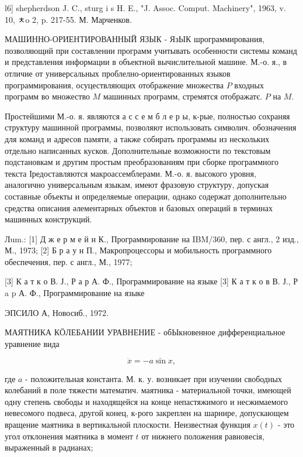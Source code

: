 \documentclass[10pt]{article}
\begin{document}
l6] shepherdson J. C., sturg i s H. E., "J. Assoc. Comput. Machinery", 1963, v. 10, ㅊo 2, p. 217-55. М. Марченков.



МАШИННО-ОРИЕНТИРОВАННЫЙ ЯЗЫК - ЯзЫК шрограммирования, позволяющий при составлении программ учитывать особенности системы команд и представления информации в объектной вычислительной машине. М.-о. я., в отличие от универсальных проблелно-ориентированных языков программирования, осуцествляющих отображение множества $P$ входных программ во множество $M$ машинных программ, стремятся отображатє. $P$ на $M$.



Простейшими М.-о. я. являются а с с е м б л е р ы, к-рые, полностью сохраняя структуру машинной программы, позволяют использовать символич. обозначения для команд и адресов памяти, а также собирать программы из нескольких отдельно написанных кусков. Дополнительные возможности по текстовым подстановкам и другим простым преобразованиям при сборке программного текста Іредоставляются макроассемблерами. М.-о. я. высокого уровня, аналогично универсальным языкам, имеют фразовую структуру, допуская составные объекты и определяемые операции, однако содержат дополнительно средства описания әлементарных объектов и базовых операций в терминах машинных конструкций.



Лum.: [1] Д ж е р м е й н К., Программирование на IBM/360, пер. с англ., 2 изд., М., 1973; [2] Б р а у н П., Макропроцессоры и мобильность программного обеспечения, пер. с англ., М., 1977;

[3] К а т к о В. Ј., Р а р А. Ф., Программирование на языке [3] К а т к о в В. Ј., Р a p А. Ф., Программирование на языке

ЭПСИЛО А, Новосиб., 1972.



МАЯТНИКА КӦЛЕБАНИИ УРАВНЕНИЕ - обЫкновенное дифференциальное уравнение вида



\[

\ddot{x}=-a \sin x,

\]



где $a$ - положительная константа. М. к. у. возникает при изучении свободных колебаний в поле тяжести математич. маятника - материальной точки, имеющей одну степень свободы и находящейся на конце непастяжимого и несжимаемого невесомого подвеса, другой конец, к-рого закреплен на шарнире, допускающем вращение маятника в вертикальной плоскости. Неизвестная функция $x(t)$ - это угол отклонения маятника в момент $t$ от нижнего положения равновесія, выраженный в радианах;
\end{document}
